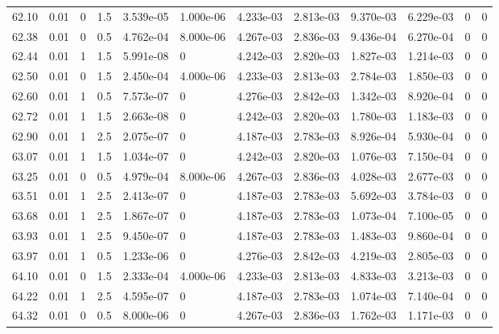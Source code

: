 \documentclass[preview]{standalone}
\begin{document}
{{{{{{{{{\begin{tabular}{L{1.2cm}C{1.2cm} C{0.3cm}C{0.5cm} C{1.4cm}C{1.4cm} C{1.4cm}C{1.4cm} C{1.6cm}C{1.6cm} C{1.6cm}C{1.6cm}}
  62.10  &  0.01  & 0     & 1.5 &  3.539e-05  & 1.000e-06  &  4.233e-03&   2.813e-03& 9.370e-03 & 6.229e-03   &  0 & 0  \\ 
  62.38  &  0.01  & 0     & 0.5 &  4.762e-04  & 8.000e-06  &  4.267e-03&   2.836e-03& 9.436e-04 & 6.270e-04   &  0 & 0  \\ 
  62.44  &  0.01  & 1     & 1.5 &  5.991e-08  & 0  &  4.242e-03&   2.820e-03& 1.827e-03 & 1.214e-03   &  0 & 0  \\ 
  62.50  &  0.01  & 0     & 1.5 &  2.450e-04  & 4.000e-06  &  4.233e-03&   2.813e-03& 2.784e-03 & 1.850e-03   &  0 & 0  \\ 
  62.60  &  0.01  & 1     & 0.5 &  7.573e-07  & 0  &  4.276e-03&   2.842e-03& 1.342e-03 & 8.920e-04   &  0 & 0  \\ 
  62.72  &  0.01  & 1     & 1.5 &  2.663e-08  & 0  &  4.242e-03&   2.820e-03& 1.780e-03 & 1.183e-03   &  0 & 0  \\ 
  62.90  &  0.01  & 1     & 2.5 &  2.075e-07  & 0  &  4.187e-03&   2.783e-03& 8.926e-04 & 5.930e-04   &  0 & 0  \\ 
  63.07  &  0.01  & 1     & 1.5 &  1.034e-07  & 0  &  4.242e-03&   2.820e-03& 1.076e-03 & 7.150e-04   &  0 & 0  \\ 
  63.25  &  0.01  & 0     & 0.5 &  4.979e-04  & 8.000e-06  &  4.267e-03&   2.836e-03& 4.028e-03 & 2.677e-03   &  0 & 0  \\ 
  63.51  &  0.01  & 1     & 2.5 &  2.413e-07  & 0  &  4.187e-03&   2.783e-03& 5.692e-03 & 3.784e-03   &  0 & 0  \\ 
  63.68  &  0.01  & 1     & 2.5 &  1.867e-07  & 0  &  4.187e-03&   2.783e-03& 1.073e-04 & 7.100e-05   &  0 & 0  \\ 
  63.93  &  0.01  & 1     & 2.5 &  9.450e-07  & 0  &  4.187e-03&   2.783e-03& 1.483e-03 & 9.860e-04   &  0 & 0  \\ 
  63.97  &  0.01  & 1     & 0.5 &  1.233e-06  & 0  &  4.276e-03&   2.842e-03& 4.219e-03 & 2.805e-03   &  0 & 0  \\ 
  64.10  &  0.01  & 0     & 1.5 &  2.333e-04  & 4.000e-06  &  4.233e-03&   2.813e-03& 4.833e-03 & 3.213e-03   &  0 & 0  \\ 
  64.22  &  0.01  & 1     & 2.5 &  4.595e-07  & 0  &  4.187e-03&   2.783e-03& 1.074e-03 & 7.140e-04   &  0 & 0  \\ 
  64.32  &  0.01  & 0     & 0.5 &  8.000e-06  & 0  &  4.267e-03&   2.836e-03& 1.762e-03 & 1.171e-03   &  0 & 0  \\ 
\hline 
\end{tabular} 

}}}}}}}}}
\end{document}
